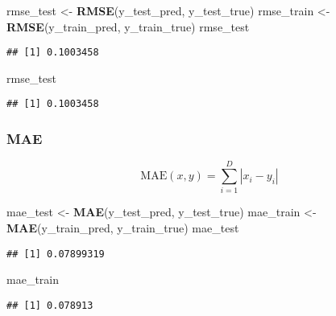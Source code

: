 \documentclass[
]{article}
\newenvironment{Shaded}{\begin{snugshade}}{\end{snugshade}}
\newcommand{\FunctionTok}[1]{\textcolor[rgb]{0.13,0.29,0.53}{\textbf{#1}}}
\newcommand{\NormalTok}[1]{#1}
\newcommand{\OtherTok}[1]{\textcolor[rgb]{0.56,0.35,0.01}{#1}}
\begin{document}
\begin{Shaded}
\begin{Highlighting}[]
\NormalTok{rmse\_test }\OtherTok{\textless{}{-}} \FunctionTok{RMSE}\NormalTok{(y\_test\_pred, y\_test\_true)}
\NormalTok{rmse\_train }\OtherTok{\textless{}{-}} \FunctionTok{RMSE}\NormalTok{(y\_train\_pred, y\_train\_true)}
\NormalTok{rmse\_test}
\end{Highlighting}
\end{Shaded}

\begin{verbatim}
## [1] 0.1003458
\end{verbatim}

\begin{Shaded}
\begin{Highlighting}[]
\NormalTok{rmse\_test}
\end{Highlighting}
\end{Shaded}

\begin{verbatim}
## [1] 0.1003458
\end{verbatim}

\subsubsection{MAE}\label{mae}

\[ \text{MAE}(x,y) = \sum_{i=1}^{D}|x_i-y_i|  \]

\begin{Shaded}
\begin{Highlighting}[]
\NormalTok{mae\_test }\OtherTok{\textless{}{-}} \FunctionTok{MAE}\NormalTok{(y\_test\_pred, y\_test\_true)}
\NormalTok{mae\_train }\OtherTok{\textless{}{-}} \FunctionTok{MAE}\NormalTok{(y\_train\_pred, y\_train\_true)}
\NormalTok{mae\_test}
\end{Highlighting}
\end{Shaded}

\begin{verbatim}
## [1] 0.07899319
\end{verbatim}

\begin{Shaded}
\begin{Highlighting}[]
\NormalTok{mae\_train}
\end{Highlighting}
\end{Shaded}

\begin{verbatim}
## [1] 0.078913
\end{verbatim}
\end{document}
